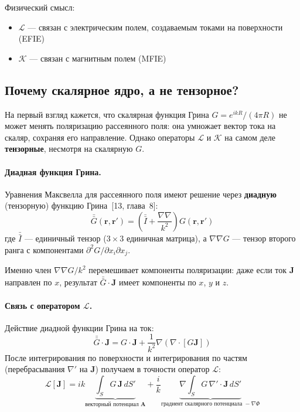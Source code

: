 \documentclass[12pt,a4paper]{article}
\begin{document}
Физический смысл:
\begin{itemize}
  \item $\mathcal{L}$ --- связан с электрическим полем, создаваемым токами на поверхности (EFIE)
  \item $\mathcal{K}$ --- связан с магнитным полем (MFIE)
\end{itemize}

\subsection{Почему скалярное ядро, а не тензорное?}
\label{sec:dyadic}

На первый взгляд кажется, что скалярная функция Грина $G = e^{ikR}/(4\pi R)$ не может менять поляризацию рассеянного поля: она умножает вектор тока на скаляр, сохраняя его направление. Однако операторы $\mathcal{L}$ и $\mathcal{K}$ на самом деле \textbf{тензорные}, несмотря на скалярную $G$.

\paragraph{Диадная функция Грина.}
Уравнения Максвелла для рассеянного поля имеют решение через \textbf{диадную} (тензорную) функцию Грина~[13, глава~8]:
\begin{equation}
  \bar{\bar{G}}(\mathbf{r},\mathbf{r}') = \left(\bar{\bar{I}} + \frac{\nabla\nabla}{k^2}\right) G(\mathbf{r},\mathbf{r}')
\end{equation}
где $\bar{\bar{I}}$ --- единичный тензор ($3\times3$ единичная матрица), а $\nabla\nabla G$ --- тензор второго ранга с компонентами $\partial^2 G / \partial x_i \partial x_j$.

Именно член $\nabla\nabla G / k^2$ перемешивает компоненты поляризации: даже если ток $\mathbf{J}$ направлен по $x$, результат $\bar{\bar{G}} \cdot \mathbf{J}$ имеет компоненты по $x$, $y$ и $z$.

\paragraph{Связь с оператором $\mathcal{L}$.}
Действие диадной функции Грина на ток:
\begin{equation}
  \bar{\bar{G}} \cdot \mathbf{J} = G \cdot \mathbf{J} + \frac{1}{k^2} \nabla(\nabla \cdot [G \mathbf{J}])
\end{equation}
После интегрирования по поверхности и интегрирования по частям (перебрасывания $\nabla'$ на $\mathbf{J}$) получаем в точности оператор $\mathcal{L}$:
\begin{equation}
  \mathcal{L}[\mathbf{J}] = ik \underbrace{\int_S G \, \mathbf{J} \, dS'}_{\text{векторный потенциал } \mathbf{A}}
  + \frac{i}{k} \underbrace{\nabla \int_S G \, \nabla'\!\cdot\mathbf{J} \, dS'}_{\text{градиент скалярного потенциала } -\nabla\Phi}
\end{equation}
\end{document}
